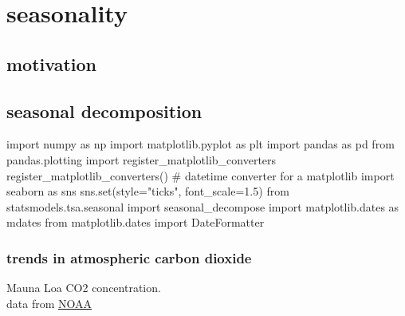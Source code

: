 \documentclass[
  letterpaper,
  DIV=11,
  numbers=noendperiod,
  oneside]{scrreprt}
\newenvironment{Shaded}{\begin{snugshade}}{\end{snugshade}}
\newcommand{\BuiltInTok}[1]{\textcolor[rgb]{0.00,0.23,0.31}{#1}}
\newcommand{\CommentTok}[1]{\textcolor[rgb]{0.37,0.37,0.37}{#1}}
\newcommand{\FloatTok}[1]{\textcolor[rgb]{0.68,0.00,0.00}{#1}}
\newcommand{\ImportTok}[1]{\textcolor[rgb]{0.00,0.46,0.62}{#1}}
\newcommand{\NormalTok}[1]{\textcolor[rgb]{0.00,0.23,0.31}{#1}}
\newcommand{\OperatorTok}[1]{\textcolor[rgb]{0.37,0.37,0.37}{#1}}
\newcommand{\StringTok}[1]{\textcolor[rgb]{0.13,0.47,0.30}{#1}}
\begin{document}
\part{seasonality}

\hypertarget{motivation-7}{%
\chapter{motivation}\label{motivation-7}}

\hypertarget{seasonal-decomposition}{%
\chapter{seasonal decomposition}\label{seasonal-decomposition}}

\begin{Shaded}
\begin{Highlighting}[]
\ImportTok{import}\NormalTok{ numpy }\ImportTok{as}\NormalTok{ np}
\ImportTok{import}\NormalTok{ matplotlib.pyplot }\ImportTok{as}\NormalTok{ plt}
\ImportTok{import}\NormalTok{ pandas }\ImportTok{as}\NormalTok{ pd}
\ImportTok{from}\NormalTok{ pandas.plotting }\ImportTok{import}\NormalTok{ register\_matplotlib\_converters}
\NormalTok{register\_matplotlib\_converters()  }\CommentTok{\# datetime converter for a matplotlib}
\ImportTok{import}\NormalTok{ seaborn }\ImportTok{as}\NormalTok{ sns}
\NormalTok{sns.}\BuiltInTok{set}\NormalTok{(style}\OperatorTok{=}\StringTok{"ticks"}\NormalTok{, font\_scale}\OperatorTok{=}\FloatTok{1.5}\NormalTok{)}
\ImportTok{from}\NormalTok{ statsmodels.tsa.seasonal }\ImportTok{import}\NormalTok{ seasonal\_decompose}
\ImportTok{import}\NormalTok{ matplotlib.dates }\ImportTok{as}\NormalTok{ mdates}
\ImportTok{from}\NormalTok{ matplotlib.dates }\ImportTok{import}\NormalTok{ DateFormatter}
\end{Highlighting}
\end{Shaded}

\hypertarget{trends-in-atmospheric-carbon-dioxide}{%
\section{trends in atmospheric carbon
dioxide}\label{trends-in-atmospheric-carbon-dioxide}}

Mauna Loa CO2 concentration.\\
data from \href{https://gml.noaa.gov/ccgg/trends/data.html}{NOAA}
\end{document}
